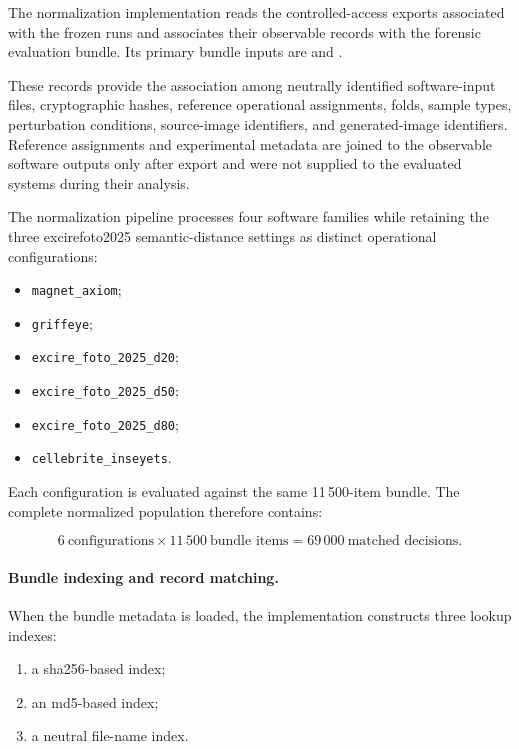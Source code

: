 The normalization implementation reads the controlled-access exports associated
with the frozen runs and associates their observable records with the forensic
evaluation bundle. Its primary bundle inputs are
and
.

These records provide the association among neutrally identified software-input
files, cryptographic hashes, reference operational assignments, folds, sample
types, perturbation conditions, source-image identifiers, and generated-image
identifiers. Reference assignments and experimental metadata are joined to the
observable software outputs only after export and were not supplied to the
evaluated systems during their analysis.

The normalization pipeline processes four software families while retaining the
three \gls{excirefoto2025} semantic-distance settings as distinct operational
configurations:

\begin{itemize}
\item \texttt{magnet\_axiom};
\item \texttt{griffeye};
\item \texttt{excire\_foto\_2025\_d20};
\item \texttt{excire\_foto\_2025\_d50};
\item \texttt{excire\_foto\_2025\_d80};
\item \texttt{cellebrite\_inseyets}.
\end{itemize}

Each configuration is evaluated against the same 11\,500-item bundle. The
complete normalized population therefore contains:

\begin{equation}
6\ \text{configurations}
\times
11\,500\ \text{bundle items}
=
69\,000\ \text{matched decisions}.
\end{equation}

\paragraph{Bundle indexing and record matching.}

When the bundle metadata is loaded, the implementation constructs three lookup
indexes:

\begin{enumerate}
\item a \gls{sha256}-based index;
\item an \gls{md5}-based index;
\item a neutral file-name index.
\end{enumerate}

